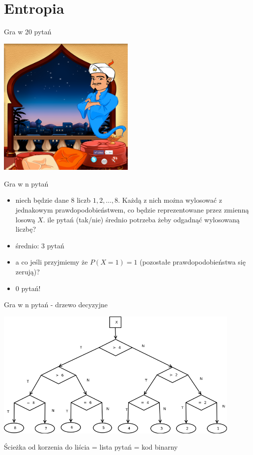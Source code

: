 \documentclass{beamer}
\begin{document}
\section{Entropia}

\begin{frame}{Gra w 20 pytań}
\begin{center}
\includegraphics[width=0.5\textwidth]{img/akinator.png}
\end{center}
\end{frame}


\begin{frame}{Gra w n pytań}
\begin{itemize}
  \item niech będzie dane 8 liczb $1, 2, \ldots, 8$. Każdą z nich można wylosować
  z jednakowym prawdopodobieństwem, co będzie reprezentowane
  przez zmienną losową $X$. ile pytań (tak/nie) średnio potrzeba żeby odgadnąć
  wylosowaną liczbę?
  \pause
  \item średnio: 3 pytań
  \item a co jeśli przyjmiemy że $P(X=1) = 1$ (pozostałe prawdopodobieństwa się zerują)?
  \pause
  \item 0 pytań!
\end{itemize}
\end{frame}

\begin{frame}{Gra w n pytań - drzewo decyzyjne}
\begin{center}
\includegraphics[width=0.9\textwidth]{img/decision_tree1.png}
\end{center}
Ścieżka od korzenia do liścia = lista pytań = kod binarny
\end{frame}
\end{document}
